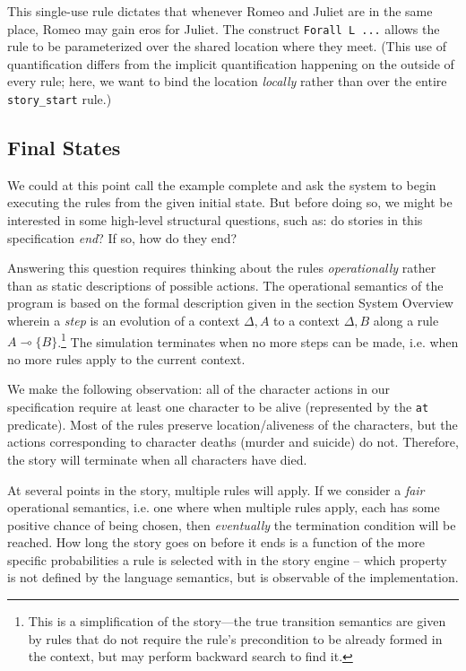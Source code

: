 \documentclass[letterpaper]{article}
\newcommand{\lolli}{\multimap}
\newcommand{\mon}[1]{\{#1\}}
\begin{document}
This single-use rule dictates that whenever Romeo and Juliet are in the
same place, Romeo may gain eros for Juliet.  The construct 
\verb|Forall L ...| allows the rule to be parameterized over the shared
location where they meet. (This use of quantification differs from the
implicit quantification happening on the outside of every rule; here, we
want to bind the location {\em locally} rather than over the entire
\verb|story_start| rule.)

\subsection{Final States}

We could at this point call the example complete and ask the system to
begin executing the rules from the given initial state. But before doing
so, we might be interested in some high-level structural questions, such
as: do stories in this specification {\em end}? If so, how do they end?

Answering this question requires thinking about the rules {\em
operationally} rather than as static descriptions of possible actions. The
operational semantics of the program is based on the formal description
given in the section System Overview wherein a {\em step} is an evolution
of a context $\Delta, A$ to a context $\Delta, B$ along a rule $A \lolli
\mon{B}$.\footnote{This is a simplification of the story---the true
transition semantics are given by rules that do not require
the rule's precondition to be already formed in the context, but may
perform backward search to find it.} The simulation terminates when no more
steps can be made, i.e.  when no more rules apply to the current context.

We make the following observation: all of the character actions in our
specification require at least one character to be alive (represented by
the \verb|at| predicate). Most of the rules preserve location/aliveness of
the characters, but the actions corresponding to character deaths (murder
and suicide) do not. Therefore, the story will terminate when all
characters have died.

At several points in the story, multiple rules will apply. If we consider a
{\em fair} operational semantics, i.e. one where when multiple rules apply,
each has some positive chance of being chosen, then {\em eventually} the
termination condition will be reached. How long the story goes on before it
ends is a function of the more specific probabilities a rule is selected
with in the story engine -- which property is not defined by the language
semantics, but is observable of the implementation.
\end{document}
